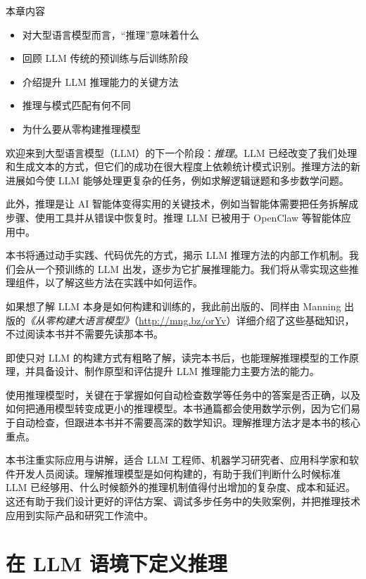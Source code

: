 \begin{myChapterIntro}{本章内容}
\begin{itemize}
\item 对大型语言模型而言，“推理”意味着什么
\item 回顾 LLM 传统的预训练与后训练阶段
\item 介绍提升 LLM 推理能力的关键方法
\item 推理与模式匹配有何不同
\item 为什么要从零构建推理模型
\end{itemize}
\end{myChapterIntro}

欢迎来到大型语言模型（LLM）的下一个阶段：\emph{推理}。LLM 已经改变了我们处理和生成文本的方式，但它们的成功在很大程度上依赖统计模式识别。推理方法的新进展如今使 LLM 能够处理更复杂的任务，例如求解逻辑谜题和多步数学问题。

此外，推理是让 AI 智能体变得实用的关键技术，例如当智能体需要把任务拆解成步骤、使用工具并从错误中恢复时。推理 LLM 已被用于 OpenClaw 等智能体应用中。

本书将通过动手实践、代码优先的方式，揭示 LLM 推理方法的内部工作机制。我们会从一个预训练的 LLM 出发，逐步为它扩展推理能力。我们将从零实现这些推理组件，以了解这些方法在实践中如何运作。

如果想了解 LLM 本身是如何构建和训练的，我此前出版的、同样由 Manning 出版的\emph{《从零构建大语言模型》}（\href{http://mng.bz/orYv}{http://mng.bz/orYv}）详细介绍了这些基础知识，不过阅读本书并不需要先读那本书。

即使只对 LLM 的构建方式有粗略了解，读完本书后，也能理解推理模型的工作原理，并具备设计、制作原型和评估提升 LLM 推理能力主要方法的能力。

使用推理模型时，关键在于掌握如何自动检查数学等任务中的答案是否正确，以及如何把通用模型转变成更小的推理模型。本书通篇都会使用数学示例，因为它们易于自动检查，但跟进本书并不需要高深的数学知识。理解推理方法才是本书的核心重点。

本书注重实际应用与讲解，适合 LLM 工程师、机器学习研究者、应用科学家和软件开发人员阅读。理解推理模型是如何构建的，有助于我们判断什么时候标准 LLM 已经够用、什么时候额外的推理机制值得付出增加的复杂度、成本和延迟。这还有助于我们设计更好的评估方案、调试多步任务中的失败案例，并把推理技术应用到实际产品和研究工作流中。

\section{在 LLM 语境下定义推理}

